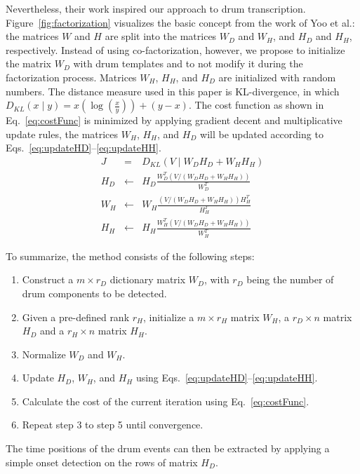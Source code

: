 \documentclass{article}
\newcommand{\figref}[1]{\mbox{Figure~\ref{#1}}}
\begin{document}
Nevertheless, their work inspired our approach to drum transcription. \figref{fig:factorization} visualizes the basic concept from the work of Yoo et al.: the matrices $W$ and $H$ are split into the  matrices $W_D$ and $W_H$, and  $H_D$ and $H_H$, respectively. Instead of using co-factorization, however, we propose to initialize the matrix $W_D$ with drum templates and to not modify it during the factorization process. Matrices $W_H$, $H_H$, and $H_D$ are initialized with random numbers. 
The distance measure used in this paper is KL-divergence, in which \(D_{KL}(x \mid y) = x(\log(\frac{x}{y})) + (y - x)\). The cost function as shown in Eq.~\eqref{eq:costFunc} is minimized by applying gradient decent and multiplicative update rules, the matrices  $W_H$, $H_H$, and $H_D$ will be updated according to \mbox{Eqs.~\eqref{eq:updateHD}--\eqref{eq:updateHH}}.  %
\begin{eqnarray}
\label{eq:costFunc}
J &=& D_{KL}(V \mid W_{D}H_{D} + W_{H}H_{H})\\
\label{eq:updateHD}
H_{D} &\leftarrow& H_{D}\frac{W_{D}^T( V / (W_{D}H_{D} + W_{H}H_{H}))}{W_{D}^T}\\
%
\label{eq:updateWH}
W_{H} &\leftarrow& W_{H}\frac{(V/(W_{D}H_{D} + W_{H}H_{H})) H_{H}^T}{H_{H}^T}\\
%
\label{eq:updateHH}
H_{H} &\leftarrow& H_{H}\frac{W_{H}^T (V/(W_{D}H_{D} + W_{H}H_{H}))}{W_{H}^T}
\end{eqnarray}

To summarize, the method consists of the following steps:
\begin{enumerate}
    \item   Construct a $m \times r_D$ dictionary matrix $W_D$, with $r_D$ being the number of drum components to be detected.
    \item   Given a pre-defined rank $r_H$, initialize a $m \times r_H$ matrix $W_H$, a $r_D \times n$ matrix $H_D$ and a $r_H \times n$ matrix $H_H$.
    \item   Normalize $W_D$ and $W_H$. 
    \item   Update $H_D$, $W_H$, and $H_H$ using Eqs.~\eqref{eq:updateHD}--\eqref{eq:updateHH}.
    \item   Calculate the cost of the current iteration using Eq.~\eqref{eq:costFunc}.
    \item   Repeat step 3 to step 5 until convergence.
\end{enumerate}
The time positions of the drum events can then be extracted by applying a simple onset detection on the rows of matrix $H_D$.
\end{document}
